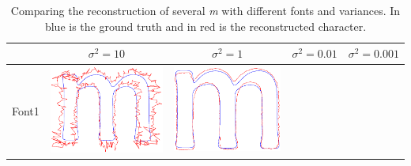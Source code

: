 \documentclass[12pt]{article}
\begin{document}
\begin{center}
\begin{table}[h]
\caption[Table caption text]{Comparing the reconstruction of several \emph{m} with different fonts and variances. In blue is the ground truth and in red is the reconstructed character.}
\label{tab:results}
\begin{tabular}{|c|c|c|c|c|}
\hline
 & $\sigma^2=10$ & $\sigma^2=1$ & $\sigma^2=0.01$ & $\sigma^2=0.001$ \\ \hline
 Font1 & 
\includegraphics[scale = 0.2]{images/f1var10} &
\includegraphics[scale = 0.2]{images/f1var1} &

\end{tabular}
\end{table}
\end{center}
\end{document}
